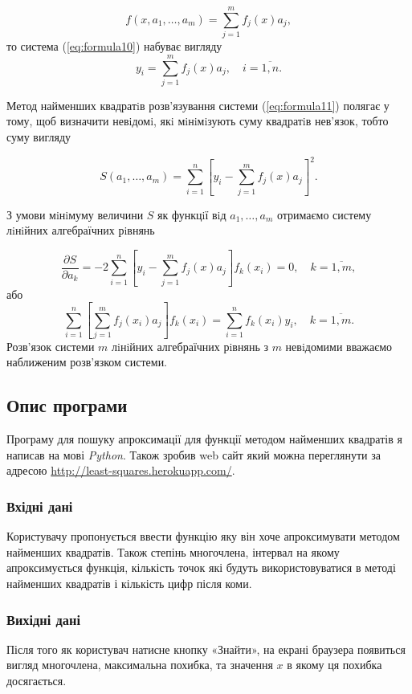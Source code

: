 \documentclass[ukrainian,14pt]{extarticle}
\begin{document}
$$ f(x, a_1, \ldots , a_m) = \sum_{j=1}^m f_j(x)a_j,$$
то система (\ref{eq:formula10}) набуває вигляду
\begin{equation}\label{eq:formula11}
    y_i = \sum_{j=1}^m f_j(x)a_j, \quad i = \overline{1,n}.
\end{equation}

Метод найменших квадратiв розв'язування системи (\ref{eq:formula11}) полягає у
тому, щоб визначити невiдомi, якi мiнiмiзують суму квадратiв нев'язок,
тобто суму вигляду

$$ S(a_1, \ldots , a_m) = \sum_{i=1}^n  \left[y_i - \sum_{j=1}^m f_j(x)a_j \right]^2.	$$

З умови мiнiмуму величини $S$ як функцiї вiд $a_1, \ldots , a_m$ отримаємо систему
лiнiйних алгебраїчних рiвнянь

$$\frac{\partial S}{\partial a_k} = -2 \sum_{i=1}^n \left[y_i - \sum_{j=1}^m f_j(x)a_j \right] f_k(x_i) = 0, \quad k=\overline{1,m},$$
або
$$\sum_{i=1}^n \left[\sum_{j=1}^m f_j(x_i)a_j \right]f_k(x_i) = \sum_{i=1}^n f_k(x_i)y_i, \quad k=\overline{1,m}.$$
Розв'язок системи $m$ лiнiйних алгебраїчних рiвнянь з $m$ невiдомими вважаємо наближеним розв’язком системи.

\newpage

\subsection{Опис програми}
Програму для пошуку апроксимації для функції методом найменших квадратів я написав на мові \textit{Python}. Також зробив web сайт
який можна переглянути за адресою
\href{http://least-squares.herokuapp.com/}{http://least-squares.herokuapp.com/}. 

\subsubsection{Вхідні дані}

Користувачу пропонується ввести функцію яку він хоче апроксимувати методом найменших квадратів. Також степінь многочлена, інтервал на якому апроксимується функція, кількість точок які будуть використовуватися в методі найменших квадратів і кількість цифр після коми.

\subsubsection{Вихідні дані}

Після того як користувач натисне кнопку «Знайти», на екрані браузера появиться вигляд многочлена, максимальна похибка, та значення $x$ в якому ця похибка досягається.
\newpage
\end{document}
